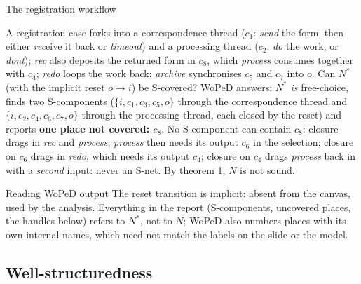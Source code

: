 \begin{examplebox}{The registration workflow}
\begin{center}
{}
\end{center}
A registration case forks into a correspondence thread ($c_1$: \emph{send} the form, then either \emph{rec}eive it back or \emph{timeout}) and a processing thread ($c_2$: \emph{do} the work, or \emph{dont}); \emph{rec} also deposits the returned form in $c_8$, which \emph{process} consumes together with $c_4$; \emph{redo} loops the work back; \emph{archive} synchronises $c_5$ and $c_7$ into $o$. Can $N^{*}$ (with the implicit reset $o \to i$) be S-covered? WoPeD answers: $N^{*}$ \emph{is} free-choice, finds two S-components ($\{i, c_1, c_3, c_5, o\}$ through the correspondence thread and $\{i, c_2, c_4, c_6, c_7, o\}$ through the processing thread, each closed by the reset) and reports \textbf{one place not covered: $c_8$}. No S-component can contain $c_8$: closure drags in \emph{rec} and \emph{process}; \emph{process} then needs its output $c_6$ in the selection; closure on $c_6$ drags in \emph{redo}, which needs its output $c_4$; closure on $c_4$ drags \emph{process} back in with a \emph{second} input: never an S-net. By theorem 1, $N$ is not sound.
\end{examplebox}
\begin{notebox}{Reading WoPeD output}
The reset transition is implicit: absent from the canvas, used by the analysis. Everything in the report (S-components, uncovered places, the handles below) refers to $N^{*}$, not to $N$; WoPeD also numbers places with its own internal names, which need not match the labels on the slide or the model.
\end{notebox}

\subsection{Well-structuredness}

